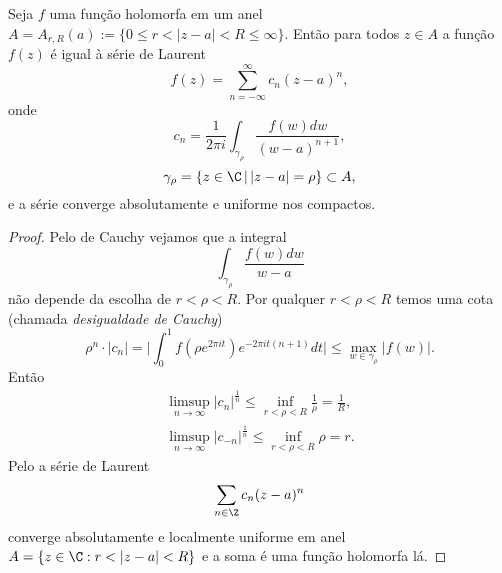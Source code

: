 \begin{teorema}
\label{t:anel-laurent}
Seja $f$ uma função holomorfa em um anel $A = A_{r,R}(a) := \{ 0\leq r < |z-a| < R \leq \infty \}$.
Então para todos $z\in A$ a função $f(z)$ é igual à série de Laurent
\[ f(z) = \sum_{n=-\infty}^\infty c_n (z-a)^n, \]
onde
\[ c_n = \frac1{2\pi i} \int_{\gamma_\rho} \frac{f(w) dw}{(w-a)^{n+1}}, \]
\[ \gamma_\rho = \{ z\in\C \,|\, |z-a|=\rho \} \subset A, \]
e a série converge absolutamente e uniforme nos compactos.
\end{teorema}
\begin{proof}
Pelo  de Cauchy vejamos que a integral
\[ \int_{\gamma_\rho} \frac{f(w)dw}{w-a}  \] 
não depende da escolha de $r<\rho<R$.
Por qualquer $r<\rho<R$ temos uma cota (chamada \emph{desigualdade de Cauchy})
\[ \rho^n \cdot |c_n| = \big|\int_0^1 f(\rho e^{2\pi i t}) e^{-2\pi i t (n+1)} dt\big|
\leq \max_{w\in\gamma_\rho} |f(w)|. \]
Então
\begin{align*}
\limsup_{n\to\infty} |c_n|^{\frac1n} \leq \inf_{r<\rho<R} \frac1\rho = \frac1{R}, \\
\limsup_{n\to\infty} |c_{-n}|^{\frac1n} \leq \inf_{r<\rho<R} \rho = r.
\end{align*}
Pelo  a série de Laurent 
\[ \sum_{n\in\Z} c_n (z-a)^n \]
converge absolutamente e localmente uniforme em anel $A = \{ z\in\C : r < |z-a| < R \}$
e a soma é uma função holomorfa lá.


\end{proof}
